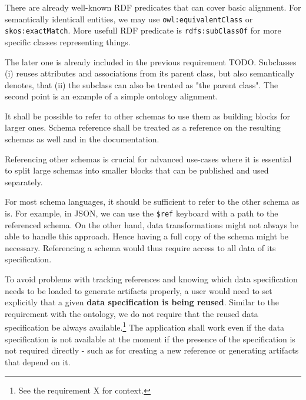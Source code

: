 There are already well-known RDF predicates that can cover basic alignment. For semantically identicall entities, we may use \verb|owl:equivalentClass| or \verb|skos:exactMatch|. More usefull RDF predicate is \verb|rdfs:subClassOf| for more specific classes representing things.

The later one is already included in the previous requirement TODO. Subclasses (i) reuses attributes and associations from its parent class, but also semantically denotes, that (ii) the subclass can also be treated as "the parent class". The second point is an example of a simple ontology alignment.

\begin{showcase}
\end{showcase}







\begin{requirement}
    It shall be possible to refer to other schemas to use them as building blocks for larger ones. Schema reference shall be treated as a reference on the resulting schemas as well and in the documentation.
    \label{analysis/requirement/schema-reference}
\end{requirement}

Referencing other schemas is crucial for advanced use-cases where it is essential to split large schemas into smaller blocks that can be published and used separately.

For most schema languages, it should be sufficient to refer to the other schema as is. For example, in JSON, we can use the \verb|$ref| keyboard with a path to the referenced schema. On the other hand, data transformations might not always be able to handle this approach. Hence having a full copy of the schema might be necessary. Referencing a schema would thus require access to all data of its specification.

To avoid problems with tracking references and knowing which data specification needs to be loaded to generate artifacts properly, a user would need to set explicitly that a given \textbf{data specification is being reused}. Similar to the requirement with the ontology, we do not require that the reused data specification be always available.\footnote{See the requirement X for context.} The application shall work even if the data specification is not available at the moment if the presence of the specification is not required directly - such as for creating a new reference or generating artifacts that depend on it.

